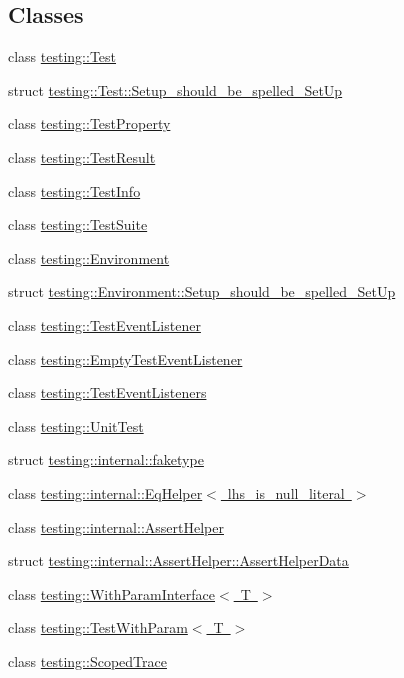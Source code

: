 \subsection*{Classes}
\begin{DoxyCompactItemize}
\item 
class \mbox{\hyperlink{classtesting_1_1_test}{testing\+::\+Test}}
\item 
struct \mbox{\hyperlink{structtesting_1_1_test_1_1_setup__should__be__spelled___set_up}{testing\+::\+Test\+::\+Setup\+\_\+should\+\_\+be\+\_\+spelled\+\_\+\+Set\+Up}}
\item 
class \mbox{\hyperlink{classtesting_1_1_test_property}{testing\+::\+Test\+Property}}
\item 
class \mbox{\hyperlink{classtesting_1_1_test_result}{testing\+::\+Test\+Result}}
\item 
class \mbox{\hyperlink{classtesting_1_1_test_info}{testing\+::\+Test\+Info}}
\item 
class \mbox{\hyperlink{classtesting_1_1_test_suite}{testing\+::\+Test\+Suite}}
\item 
class \mbox{\hyperlink{classtesting_1_1_environment}{testing\+::\+Environment}}
\item 
struct \mbox{\hyperlink{structtesting_1_1_environment_1_1_setup__should__be__spelled___set_up}{testing\+::\+Environment\+::\+Setup\+\_\+should\+\_\+be\+\_\+spelled\+\_\+\+Set\+Up}}
\item 
class \mbox{\hyperlink{classtesting_1_1_test_event_listener}{testing\+::\+Test\+Event\+Listener}}
\item 
class \mbox{\hyperlink{classtesting_1_1_empty_test_event_listener}{testing\+::\+Empty\+Test\+Event\+Listener}}
\item 
class \mbox{\hyperlink{classtesting_1_1_test_event_listeners}{testing\+::\+Test\+Event\+Listeners}}
\item 
class \mbox{\hyperlink{classtesting_1_1_unit_test}{testing\+::\+Unit\+Test}}
\item 
struct \mbox{\hyperlink{structtesting_1_1internal_1_1faketype}{testing\+::internal\+::faketype}}
\item 
class \mbox{\hyperlink{classtesting_1_1internal_1_1_eq_helper}{testing\+::internal\+::\+Eq\+Helper$<$ lhs\+\_\+is\+\_\+null\+\_\+literal $>$}}
\item 
class \mbox{\hyperlink{classtesting_1_1internal_1_1_assert_helper}{testing\+::internal\+::\+Assert\+Helper}}
\item 
struct \mbox{\hyperlink{structtesting_1_1internal_1_1_assert_helper_1_1_assert_helper_data}{testing\+::internal\+::\+Assert\+Helper\+::\+Assert\+Helper\+Data}}
\item 
class \mbox{\hyperlink{classtesting_1_1_with_param_interface}{testing\+::\+With\+Param\+Interface$<$ T $>$}}
\item 
class \mbox{\hyperlink{classtesting_1_1_test_with_param}{testing\+::\+Test\+With\+Param$<$ T $>$}}
\item 
class \mbox{\hyperlink{classtesting_1_1_scoped_trace}{testing\+::\+Scoped\+Trace}}
\end{DoxyCompactItemize}
